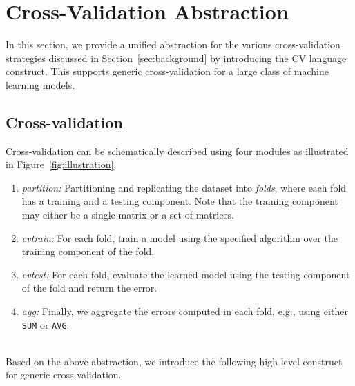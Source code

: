 \documentclass{vldb}
\newcommand{\topic}[1]{\par \smallskip \smallskip \noindent{\bf \uline{#1}}}
\begin{document}
\section{Cross-Validation Abstraction}
\label{sec:abstraction}
In this section, we provide a unified abstraction for the various
cross-validation strategies discussed in Section~\ref{sec:background} by
introducing the CV language construct. This supports generic cross-validation
for a large class of machine learning models.

\subsection{Cross-validation}
Cross-validation can be schematically described using four modules as
illustrated in Figure~\ref{fig:illustration}.
\begin{enumerate}
\item {\em partition:} Partitioning and replicating the dataset into {\em
folds}, where each fold has a training and a testing component. Note that the
training component may either be a single matrix or a set of matrices.
\item {\em cvtrain:} For each fold, train a model using the specified algorithm
over the training component of the fold.
\item {\em cvtest:} For each fold, evaluate the learned model using the testing
component of the fold and return the error.
\item {\em agg:} Finally, we aggregate the errors computed in
each fold, e.g., using either {\tt SUM} or {\tt AVG}.
\end{enumerate}

\topic{Language construct} \\
Based on the above abstraction, we introduce the following high-level construct
for generic cross-validation. \\
\begin{center}
\end{center}
\end{document}
